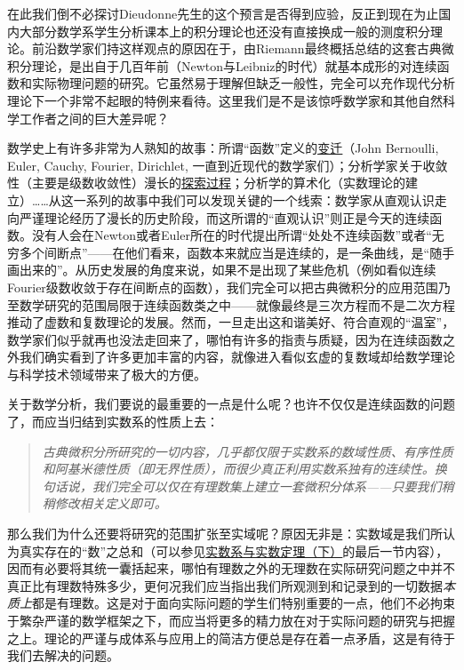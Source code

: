 \documentclass[12pt,a4paper]{article}
\begin{document}
{{			在此我们倒不必探讨Dieudonne先生的这个预言是否得到应验，反正到现在为止国内大部分数学系学生分析课本上的积分理论也还没有直接换成一般的测度积分理论。前沿数学家们持这样观点的原因在于，由Riemann最终概括总结的这套古典微积分理论，是出自于几百年前（Newton与Leibniz的时代）就基本成形的对连续函数和实际物理问题的研究。它虽然易于理解但缺乏一般性，完全可以充作现代分析理论下一个非常不起眼的特例来看待。这里我们是不是该惊呼数学家和其他自然科学工作者之间的巨大差异呢？
			
			数学史上有许多非常为人熟知的故事：所谓“函数”定义的\href{http://www.math168.com/sxsh/888.htm}{\underline{变迁}}（John Bernoulli, Euler, Cauchy, Fourier, Dirichlet, 一直到近现代的数学家们）；分析学家关于收敛性（主要是级数收敛性）漫长的\href{https://wenku.baidu.com/view/8cbeadd376eeaeaad1f33046.html?sxts=1530453114865}{\underline{探索过程}}；分析学的算术化（实数理论的建立）……从这一系列的故事中我们可以发现关键的一个线索：数学家从直观认识走向严谨理论经历了漫长的历史阶段，而这所谓的“直观认识”则正是今天的连续函数。没有人会在Newton或者Euler所在的时代提出所谓“处处不连续函数”或者“无穷多个间断点”——在他们看来，函数本来就应当是连续的，是一条曲线，是“随手画出来的”。从历史发展的角度来说，如果不是出现了某些危机（例如看似连续Fourier级数收敛于存在间断点的函数），我们完全可以把古典微积分的应用范围乃至数学研究的范围局限于连续函数类之中——就像最终是三次方程而不是二次方程推动了虚数和复数理论的发展。然而，一旦走出这和谐美好、符合直观的“温室”，数学家们似乎就再也没法走回来了，哪怕有许多的指责与质疑，因为在连续函数之外我们确实看到了许多更加丰富的内容，就像进入看似玄虚的复数域却给数学理论与科学技术领域带来了极大的方便。
			
			关于数学分析，我们要说的最重要的一点是什么呢？也许不仅仅是连续函数的问题了，而应当归结到实数系的性质上去：
			\begin{quote}\itshape
				古典微积分所研究的一切内容，几乎都仅限于实数系的数域性质、有序性质和阿基米德性质（即无界性质），而很少真正利用实数系独有的连续性。换句话说，我们完全可以仅在有理数集上建立一套微积分体系——只要我们稍稍修改相关定义即可。
			\end{quote}
			
			那么我们为什么还要将研究的范围扩张至实域呢？原因无非是：实数域是我们所认为真实存在的“数”之总和（可以参见\href{http://www.cnblogs.com/xjtu-blacksmith/p/7625717.html}{\underline{实数系与实数定理（下）}}的最后一节内容），因而有必要将其统一囊括起来，哪怕有理数之外的无理数在实际研究问题之中并不真正比有理数特殊多少，更何况我们应当指出我们所观测到和记录到的一切数据{\slshape 本质上}都是有理数。这是对于面向实际问题的学生们特别重要的一点，他们不必拘束于繁杂严谨的数学框架之下，而应当将更多的精力放在对于实际问题的研究与把握之上。理论的严谨与成体系与应用上的简洁方便总是存在着一点矛盾，这是有待于我们去解决的问题。
			
}}
\end{document}
